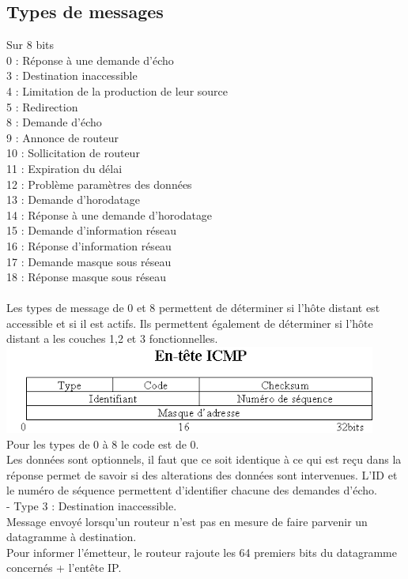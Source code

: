 \documentclass{article}
\begin{document}
\subsection{Types de messages}
Sur 8 bits \\
0 : Réponse à une demande d'écho \\
3 : Destination inaccessible \\
4 : Limitation de la production de leur source \\
5 : Redirection \\
8 : Demande d'écho \\
9 : Annonce de routeur \\
10 : Sollicitation de routeur \\
11 : Expiration du délai \\
12 : Problème paramètres des données \\
13 : Demande d'horodatage \\ 
14 : Réponse à une demande d'horodatage \\
15 : Demande d'information réseau \\
16 : Réponse d'information réseau \\
17 : Demande masque sous réseau \\
18 : Réponse masque sous réseau \\
\\
Les types de message de 0 et 8 permettent de déterminer si l'hôte distant est accessible et si il est actifs. Ils permettent également de déterminer si l'hôte distant a les couches 1,2 et 3 fonctionnelles. 
\\ 
\includegraphics{image/icmp.png} 
\\
Pour les types de 0 à 8 le code est de 0. \\
Les données sont optionnels, il faut que ce soit identique à ce qui est reçu dans la réponse permet de savoir si des alterations des données sont intervenues. L'ID et le numéro de séquence permettent d'identifier chacune des demandes d'écho. 
\\

- Type 3 : Destination inaccessible. \\
Message envoyé lorsqu'un routeur n'est pas en mesure de faire parvenir un datagramme à destination. \\
Pour informer l'émetteur, le routeur rajoute les 64 premiers bits du datagramme concernés + l'entête IP. \\
\\
\end{document}

